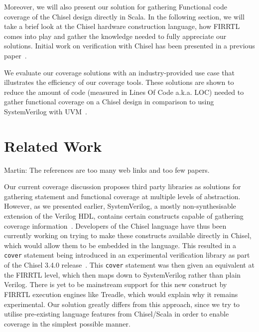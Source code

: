 \documentclass[conference]{IEEEtran}
\newcommand{\martin}[1]{{\color{blue} Martin: #1}}
\begin{document}
Moreover, we will also present our solution for gathering Functional code coverage of the Chisel design directly in Scala. In the following section, we will take a brief look at the Chisel hardware construction language, how FIRRTL comes into play and gather the knowledge needed to fully appreciate our solutions. Initial work on verification with Chisel has been presented in a previous paper~\cite{blind}. %

We evaluate our coverage solutions with an industry-provided use case that illustrates the efficiency of our coverage tools. These solutions are shown to reduce the amount of code (measured in Lines Of Code a.k.a. LOC) needed to gather functional coverage on a Chisel design in comparison to using SystemVerilog with UVM~\cite{uvm2015}.

\section{Related Work}

\martin{The references are too many web links and too few papers.}

Our current coverage discussion proposes third party libraries  as solutions for gathering statement and functional coverage at multiple levels of abstraction. However, as we presented earlier, SystemVerilog, a mostly non-synthesisable extension of the Verilog HDL, contains certain constructs capable of gathering coverage information~\cite{spear2008systemverilog}. Developers of the Chisel language have thus been currently working on trying to make these constructs available directly in Chisel, which would allow them to be embedded in the language. This resulted in a \texttt{cover} statement being introduced in an experimental verification library as part of the Chisel 3.4.0 release~\cite{chisel3.4release_notes}. This \texttt{cover} statement was then given an equivalent at the FIRRTL level, which then maps down to SystemVerilog rather than plain Verilog. There is yet to be mainstream support for this new construct by FIRRTL execution engines like Treadle, which would explain why it remains experimental. Our solution greatly differs from this approach, since we try to utilise pre-existing language features from Chisel/Scala in order to enable coverage in the simplest possible manner. 
\end{document}
